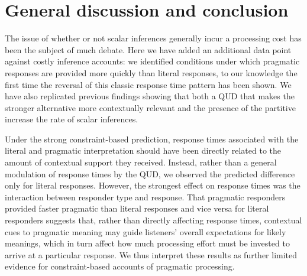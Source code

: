 \documentclass[10pt,letterpaper]{article}
\begin{document}


\section{General discussion and conclusion}

The issue of whether or not scalar inferences generally incur a processing cost has been the subject of much debate. Here we have added an additional data point against costly inference accounts: we identified  conditions under which pragmatic responses are provided more quickly than literal responses, to our knowledge the first time the reversal of this classic response time pattern has been shown. We have also replicated previous findings showing that both a QUD that makes the stronger alternative more contextually relevant and the presence of the partitive increase the rate of scalar inferences. 

Under the strong constraint-based prediction, response times associated with the literal and pragmatic interpretation should have been directly related to the amount of contextual support they received. Instead, rather than  a general modulation of response times by the QUD, we observed the predicted difference only for literal responses. However, the strongest effect on response times was the interaction between responder type and response. That pragmatic responders  provided faster pragmatic than literal responses and vice versa for literal responders suggests that, rather than directly affecting response times, contextual cues to pragmatic meaning may guide listeners' overall expectations for likely meanings, which in turn affect how much processing effort must be invested to arrive at a particular response. We thus interpret these results as further limited evidence for constraint-based accounts of pragmatic processing. 
\end{document}
